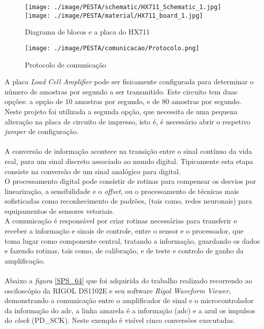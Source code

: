 \begin{figure}[H]
	\centering
	\texttt{[image: ./image/PESTA/schematic/HX711\_Schematic\_1.jpg]}
	\texttt{[image: ./image/PESTA/material/HX711\_board\_1.jpg]}
	\caption{Diagrama de blocos e a placa do HX711}
	\label{HX711_Schematic_1}
\end{figure}
\begin{figure}[H]
	\centering
	\texttt{[image: ./image/PESTA/comunicacao/Protocolo.png]}
	\caption{Protocolo de comunicação}
	\label{Protocolo}
\end{figure}
A placa \textit{Load Cell Amplifier} pode ser fisicamente configurada para determinar o número de amostras por segundo a ser transmitido. Este circuito tem duas opções: a opção de 10 amostras por segundo, e de 80 amostras por segundo. Neste projeto foi utilizada a segunda opção, que necessita de uma pequena alteração na placa de circuito de impresso, isto é, é necessário abrir o respetivo \textit{jumper} de configuração.
\\
\\
A conversão de informação acontece na transição entre o sinal contínuo da vida real, para um sinal discreto associado ao mundo digital. Tipicamente esta etapa consiste na conversão de um sinal analógico para digital.\cite{book-9}
\\
O processamento digital pode consistir de rotinas para compensar os desvios por linearização, a sensibilidade e o \textit{offset}, ou o processamento de técnicas mais sofisticadas como reconhecimento de padrões, (tais como, redes neuronais) para equipamentos de sensores vetoriais.\cite{book-9}
\\
A comunicação é responsável por criar rotinas necessárias para transferir e receber a informação e sinais de controle, entre o sensor e o processador, que toma lugar como componente central, tratando a informação, guardando os dados e fazendo rotinas, tais como, de calibração, e de teste e controlo de ganho da amplificação. \cite{book-9}
\\
\\
Abaixo a \textit{figura} \ref{SPS_64} que foi adquirida do trabalho realizado recorrendo ao osciloscópio da RIGOL DS1102E e seu software \textit{Rigol Waveform Viewer}, demonstrando a comunicação entre o amplificador de sinal e o microcontrolador da informação do \acs{adc}, a linha amarela é a informação (\acs{adc}) e a azul os impulsos do \textit{clock} (PD\_SCK). Neste exemplo é visível cinco conversões executadas.
